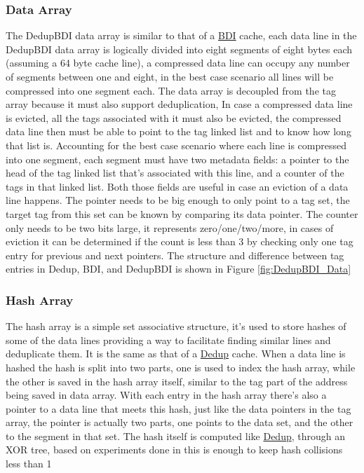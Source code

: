 \subsubsection{Data Array}
\label{sssec:DedupBDIData}
The DedupBDI data array is similar to that of a \hyperref[sssec:BDIData]{BDI} cache, each data line in the DedupBDI data array is logically divided into eight segments of eight bytes each (assuming a 64 byte cache line), a compressed data line can occupy any number of segments between one and eight, in the best case scenario all lines will be compressed into one segment each. The data array is decoupled from the tag array because it must also support deduplication, In case a compressed data line is evicted, all the tags associated with it must also be evicted, the compressed data line then must be able to point to the tag linked list and to know how long that list is. Accounting for the best case scenario where each line is compressed into one segment, each segment must have two metadata fields: a pointer to the head of the tag linked list that's associated with this line, and a counter of the tags in that linked list. Both those fields are useful in case an eviction of a data line happens. The pointer needs to be big enough to only point to a tag set, the target tag from this set can be known by comparing its data pointer. The counter only needs to be two bits large, it represents zero/one/two/more, in cases of eviction it can be determined if the count is less than 3 by checking only one tag entry for previous and next pointers. The structure and difference between tag entries in Dedup, BDI, and DedupBDI is shown in Figure \ref{fig:DedupBDI_Data}
\subsubsection{Hash Array}
\label{sssec:DedupBDIHash}
The hash array is a simple set associative structure, it's used to store hashes of some of the data lines providing a way to facilitate finding similar lines and deduplicate them. It is the same as that of a \hyperref[sssec:DedupHash]{Dedup} cache. When a data line is hashed the hash is split into two parts, one is used to index the hash array, while the other is saved in the hash array itself, similar to the tag part of the address being saved in data array. With each entry in the hash array there's also a pointer to a data line that meets this hash, just like the data pointers in the tag array, the pointer is actually two parts, one points to the data set, and the other to the segment in that set. The hash itself is computed like \hyperref[sssec:DedupHash]{Dedup}, through an XOR tree, based on experiments done in \cite{tian2014last} this is enough to keep hash collisions less than 1%

